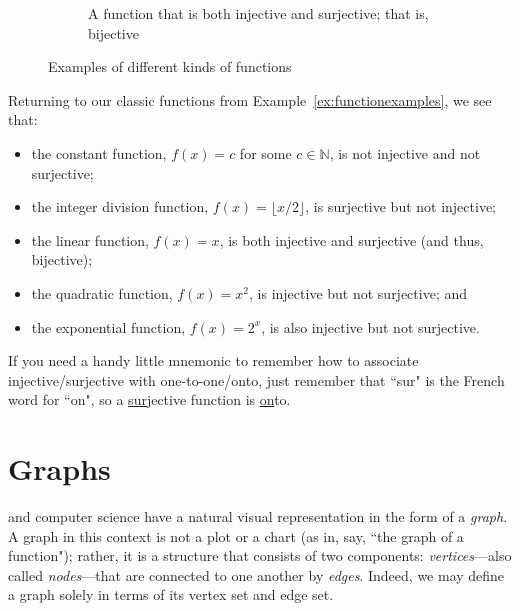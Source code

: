 \begin{figure}[p!]
\begin{subfigure}{\textwidth}
\caption{A function that is both injective and surjective; that is, bijective}
\label{subfig:bijective}
\end{subfigure}
\caption{Examples of different kinds of functions}
\label{fig:functiontypes}
\end{figure}

\begin{example}
Returning to our classic functions from Example~\ref{ex:functionexamples}, we see that:
\begin{itemize}
\item the constant function, $f(x) = c$ for some $c \in \mathbb{N}$, is not injective and not surjective;
\item the integer division function, $f(x) = \lfloor x/2 \rfloor$, is surjective but not injective;
\item the linear function, $f(x) = x$, is both injective and surjective (and thus, bijective);
\item the quadratic function, $f(x) = x^{2}$, is injective but not surjective; and
\item the exponential function, $f(x) = 2^{x}$, is also injective but not surjective.
\end{itemize}
\end{example}

\begin{remark}
If you need a handy little mnemonic to remember how to associate injective/surjective with one-to-one/onto, just remember that ``sur" is the French word for ``on", so a \ul{sur}jective function is \ul{on}to.
\end{remark}

\section{Graphs}

 and computer science have a natural visual representation in the form of a \emph{graph}. A graph in this context is not a plot or a chart (as in, say, ``the graph of a function"); rather, it is a structure that consists of two components: \emph{vertices}---also called \emph{nodes}---that are connected to one another by \emph{edges}. Indeed, we may define a graph solely in terms of its vertex set and edge set.

